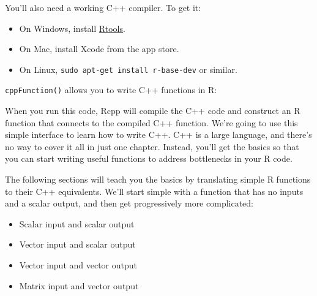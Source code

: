 You'll also need a working C++ compiler. To get it:

\begin{itemize}
\itemsep1pt\parskip0pt
\item
  On Windows, install
  \href{http://cran.r-project.org/bin/windows/Rtools/}{Rtools}.
\item
  On Mac, install Xcode from the app store.
\item
  On Linux, \texttt{sudo apt-get install r-base-dev} or similar.
\end{itemize}


\texttt{cppFunction()} allows you to write C++ functions in R:

\begin{Shaded}
\begin{Highlighting}[]
\NormalTok{(}
\NormalTok{)}
\NormalTok{(}\NormalTok{, }\NormalTok{, }\NormalTok{)}
\end{Highlighting}
\end{Shaded}

When you run this code, Rcpp will compile the C++ code and construct an
R function that connects to the compiled C++ function. We're going to
use this simple interface to learn how to write C++. C++ is a large
language, and there's no way to cover it all in just one chapter.
Instead, you'll get the basics so that you can start writing useful
functions to address bottlenecks in your R code.

The following sections will teach you the basics by translating simple R
functions to their C++ equivalents. We'll start simple with a function
that has no inputs and a scalar output, and then get progressively more
complicated:

\begin{itemize}
\itemsep1pt\parskip0pt
\item
  Scalar input and scalar output
\item
  Vector input and scalar output
\item
  Vector input and vector output
\item
  Matrix input and vector output
\end{itemize}


